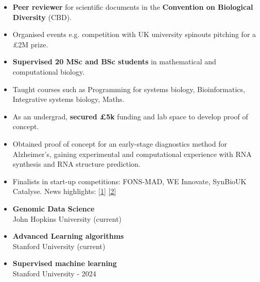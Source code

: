\documentclass[10pt,a4paper,ragged2e,withhyper]{altacv}
\begin{document}
\begin{paracol}{2}
\begin{itemize}
\item \textbf{Peer reviewer} for scientific documents in the \textbf{Convention on Biological Diversity} (CBD). 
\end{itemize}
 \medskip

\switchcolumn


\begin{itemize}
\item Organised events e.g. competition with UK university spinouts pitching for a £2M prize.
\end{itemize}
\vspace{-1.5\baselineskip} %
\divider

\begin{itemize}
\item \textbf{Supervised 20 MSc and BSc students} in mathematical and computational biology.
\item Taught courses such as Programming for systems biology, Bioinformatics, Integrative systems biology, Maths.
\end{itemize}
\vspace{-0.5\baselineskip} %

\divider

\begin{itemize}
\item As an undergrad, \textbf{secured £5k} funding and lab space to develop proof of concept.
    \item Obtained proof of concept for an early-stage diagnostics method
for Alzheimer’s, gaining experimental and computational experience with RNA synthesis and RNA structure prediction. 
\item Finalists in start-up competitions: FONS-MAD, WE Innovate, SynBioUK Catalyse. News highlights: \faLink \href{https://www.imperial.ac.uk/news/187629/four-student-ideas-that-could-change/}{[1]} \href{https://www.imperial.ac.uk/news/190372/five-women-led-startups-building-better-future/}{[2]}
\end{itemize}

\medskip
{}

\begin{itemize}
    \item \textbf{Genomic Data Science}\\John Hopkins University (current)
        \item \textbf{Advanced Learning algorithms}\\ Stanford University (current)
        \item \textbf{Supervised machine learning}\\ Stanford University - 2024
\end{itemize}


\end{paracol}
\end{document}
